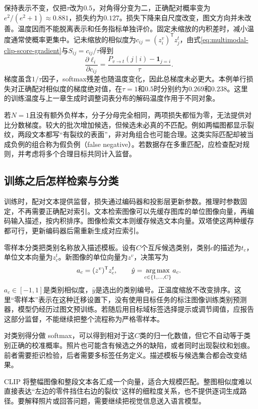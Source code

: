 保持表示不变，仅把$\tau$改为$0.5$，对角得分变为二，正确配对概率变为$e^2/(e^2+1)\approx0.881$，损失约为$0.127$。损失下降来自尺度改变，图文方向并未改善。温度因而不能脱离表示和任务指标单独评价。固定未缩放的内积差时，减小温度通常使概率更集中。记未缩放的相似度为$c_{ij}=(z_i^v)^{\mathsf T}z_j^t$，由式\eqref{eq:multimodal-clip-score-gradient}与$S_{ij}=c_{ij}/\tau$得到
\[
 \frac{\partial\ell_i}{\partial c_{ij}}
 =\frac{P_{v\to t}(j\mid i)-\mathbf1_{j=i}}{\tau}.
\]
梯度虽含$1/\tau$因子，softmax残差也随温度变化，因此总梯度未必更大。本例单行损失对正确配对相似度的梯度绝对值，在$\tau=1$和$0.5$时分别约为$0.269$和$0.238$。这里的训练温度与上一章生成时调整词表分布的解码温度作用于不同对象。

若$N=1$且没有额外负样本，分子分母完全相同，两项损失都恒为零，无法提供对比分数梯度。较大的批次增加候选，但候选未必真的不匹配。例如两幅图都显示裂纹，两段文本都写“有裂纹的表面”，非对角组合也可能合理。这类实际匹配却被当成负例的组合称为假负例（false negative）。若数据存在多重匹配，应检查配对规则，并考虑将多个合理目标共同计入监督。

\subsection{训练之后怎样检索与分类}
训练时，配对文本提供监督，损失通过编码器和投影层更新参数。推理时参数固定，不再需要正确配对索引。文本检索图像可以先缓存图库的单位图像向量，再编码输入描述，按内积排序。图像检索文本则缓存候选文本向量。双塔使这两种缓存都可行，更新编码器后需重新生成对应索引。

零样本分类把类别名称放入描述模板。设有$C$个互斥候选类别，类别$c$的描述为$t_c$，单位文本向量为$z_c^t$。新图像的单位向量为$z^v$，决策写为
\begin{equation}
 a_c=(z^v)^{\mathsf T}z_c^t,\qquad
 \hat y=\mathop{\mathrm{arg\,max}}_{c\in\{1,\ldots,C\}}a_c.
\end{equation}
$a_c\in[-1,1]$是类别相似度，$\hat y$是选出的类别编号。正温度缩放不改变排序。这里“零样本”表示在这种迁移设置下，没有使用目标任务的标注图像训练类别预测器，模型仍经历过图文预训练。若随后用目标域标签选择提示或调节阈值，应报告这部分监督，不能继续把整个流程称为严格零样本。

对类别得分做 softmax，可以得到相对于这$C$类的归一化数值，但它不自动等于类别正确的校准概率。照片也可能含有候选之外的缺陷，或者同时出现裂纹和划痕。前者需要拒识检验，后者需要多标签任务定义。描述模板与候选集合都会改变结果。

CLIP 将整幅图像和整段文本各汇成一个向量，适合大规模匹配。整图相似度难以直接表达“左边的零件挡住右边的裂纹”这样的细粒度关系，也不提供逐词生成路径。要解释照片或回答问题，需要继续把视觉信息送入语言模型。

